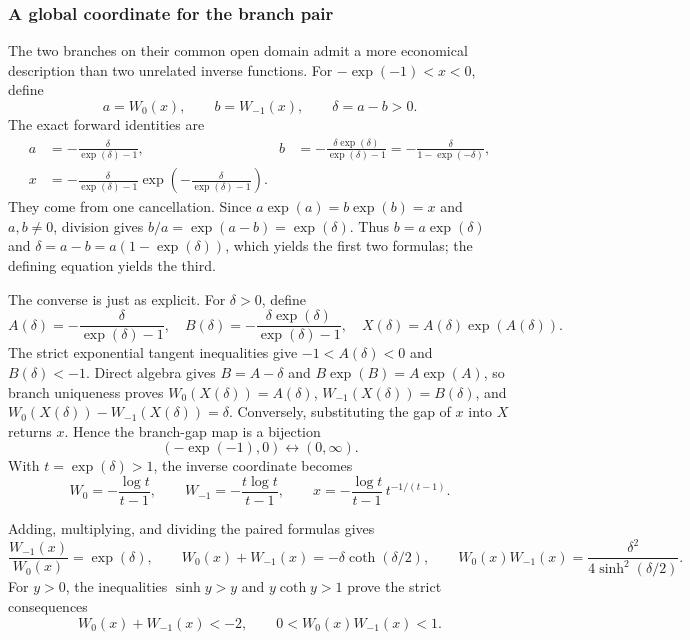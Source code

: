 \documentclass[11pt,oneside]{article}
\theoremstyle{definition}
\theoremstyle{remark}
\begin{document}
\subsubsection{A global coordinate for the branch pair}
The two branches on their common open domain admit a more economical
description than two unrelated inverse functions.  For
\(-\exp(-1)<x<0\), define
\[
 a=W_0(x),\qquad b=W_{-1}(x),\qquad
 \delta=a-b>0.
\]
The exact forward identities are
\begin{align*}
 a&=-\frac{\delta}{\exp(\delta)-1},&
 b&=-\frac{\delta\exp(\delta)}{\exp(\delta)-1}
    =-\frac{\delta}{1-\exp(-\delta)},\\
 x&=-\frac{\delta}{\exp(\delta)-1}
       \exp\!\left(-\frac{\delta}{\exp(\delta)-1}\right).
\end{align*}
They come from one cancellation.  Since
\(a\exp(a)=b\exp(b)=x\) and \(a,b\ne0\), division gives
\(b/a=\exp(a-b)=\exp(\delta)\).  Thus
\(b=a\exp(\delta)\) and
\(\delta=a-b=a(1-\exp(\delta))\), which yields the first two formulas;
the defining equation yields the third.

The converse is just as explicit.  For \(\delta>0\), define
\[
 A(\delta)=-\frac{\delta}{\exp(\delta)-1},\quad
 B(\delta)=-\frac{\delta\exp(\delta)}{\exp(\delta)-1},\quad
 X(\delta)=A(\delta)\exp(A(\delta)).
\]
The strict exponential tangent inequalities give
\(-1<A(\delta)<0\) and \(B(\delta)<-1\).  Direct algebra gives
\(B=A-\delta\) and \(B\exp(B)=A\exp(A)\), so branch uniqueness proves
\(W_0(X(\delta))=A(\delta)\),
\(W_{-1}(X(\delta))=B(\delta)\), and
\(W_0(X(\delta))-W_{-1}(X(\delta))=\delta\).  Conversely,
substituting the gap of \(x\) into \(X\) returns \(x\).  Hence the branch-gap
map is a bijection
\[
 (-\exp(-1),0)\longleftrightarrow(0,\infty).
\]
With \(t=\exp(\delta)>1\), the inverse coordinate becomes
\[
 W_0=-\frac{\log t}{t-1},\qquad
 W_{-1}=-\frac{t\log t}{t-1},\qquad
 x=-\frac{\log t}{t-1}\,t^{-1/(t-1)}.
\]

Adding, multiplying, and dividing the paired formulas gives
\[
 \frac{W_{-1}(x)}{W_0(x)}=\exp(\delta),\qquad
 W_0(x)+W_{-1}(x)=-\delta\coth(\delta/2),\qquad
 W_0(x)W_{-1}(x)=\frac{\delta^2}{4\sinh^2(\delta/2)}.
\]
For \(y>0\), the inequalities \(\sinh y>y\) and
\(y\coth y>1\) prove the strict consequences
\[
 W_0(x)+W_{-1}(x)<-2,
 \qquad 0<W_0(x)W_{-1}(x)<1.
\]
\end{document}
